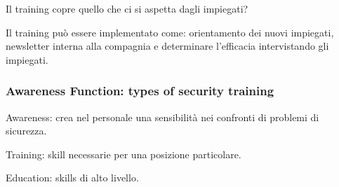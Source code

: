 Il training copre quello che ci si aspetta dagli impiegati?

Il training può essere implementato come: orientamento dei nuovi impiegati, 
newsletter interna alla compagnia e determinare l'efficacia intervistando gli 
impiegati.


\subsubsection{Awareness Function: types of security training}

Awareness: crea nel personale una sensibilità nei confronti di problemi di 
sicurezza.

Training: skill necessarie per una posizione particolare.

Education: skills di alto livello.
